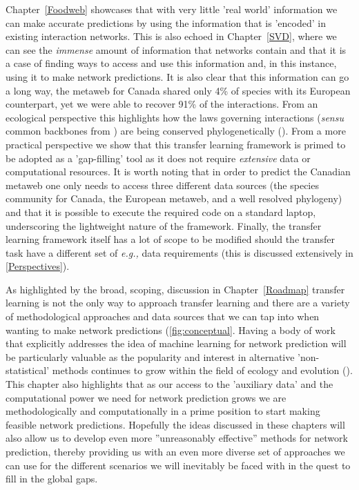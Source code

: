 \begin{refsection}
Chapter~\ref{Foodweb} showcases that with very little 'real world' information we can make accurate predictions by using the information that is 'encoded' in existing interaction networks. This is also echoed in Chapter~\ref{SVD}, where we can see the \emph{immense} amount of information that networks contain and that it is a case of finding ways to access and use this information and, in this instance, using it to make network predictions. It is also clear that this information can go a long way, the metaweb for Canada shared only 4\% of species with its European counterpart, yet we were able to recover 91\% of the interactions. From an ecological perspective this highlights how the laws governing interactions (\emph{sensu} common backbones from \cite{BramonMora2018Identifying}) are being conserved phylogenetically (\cite{Davies2021EcoRed, Elmasri2020HieBay, Gomez2010EcoInt}). From a more practical perspective we show that this transfer learning framework is primed to be adopted as a 'gap-filling' tool as it does not require \emph{extensive} data or computational resources. It is worth noting that in order to predict the Canadian metaweb one only needs to access three different data sources (the species community for Canada, the European metaweb, and a well resolved phylogeny) and that it is possible to execute the required code on a standard laptop, underscoring the lightweight nature of the framework. Finally, the transfer learning framework itself has a lot of scope to be modified should the transfer task have a different set of \emph{e.g.,} data requirements (this is discussed extensively in \autoref{Perspectives}). 

As highlighted by the broad, scoping, discussion in Chapter~\ref{Roadmap} transfer learning is not the only way to approach transfer learning and there are a variety of methodological approaches and data sources that we can tap into when wanting to make network predictions (\autoref{fig:conceptual}. Having a body of work that explicitly addresses the idea of machine learning for network prediction will be particularly valuable as the popularity and interest in alternative 'non-statistical' methods continues to grow within the field of ecology and evolution (\cite{Pichler2023Machine, Cuff2023Chapter}). This chapter also highlights that as our access to the 'auxiliary data' and the computational power we need for network prediction grows we are methodologically and computationally in a prime position to start making feasible network predictions. Hopefully the ideas discussed in these chapters will also allow us to develop even more ''unreasonably effective'' methods for network prediction, thereby providing us with an even more diverse set of approaches we can use for the different scenarios we will inevitably be faced with in the quest to fill in the global gaps.


\end{refsection}
